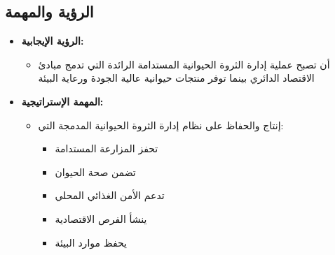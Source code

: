 \subsection{الرؤية والمهمة}
\begin{itemize}
    \item \textbf{الرؤية الإيجابية:}
    \begin{itemize}
        \item أن تصبح عملية إدارة الثروة الحيوانية المستدامة الرائدة التي تدمج مبادئ الاقتصاد الدائري بينما توفر منتجات حيوانية عالية الجودة ورعاية البيئة
    \end{itemize}
    
    \item \textbf{المهمة الإستراتيجية:}
    \begin{itemize}
        \item إنتاج والحفاظ على نظام إدارة الثروة الحيوانية المدمجة التي:
        \begin{itemize}
            \item تحفز المزارعة المستدامة
            \item تضمن صحة الحيوان
            \item تدعم الأمن الغذائي المحلي
            \item ينشأ الفرص الاقتصادية
            \item يحفظ موارد البيئة
        \end{itemize}
    \end{itemize}
\end{itemize}

